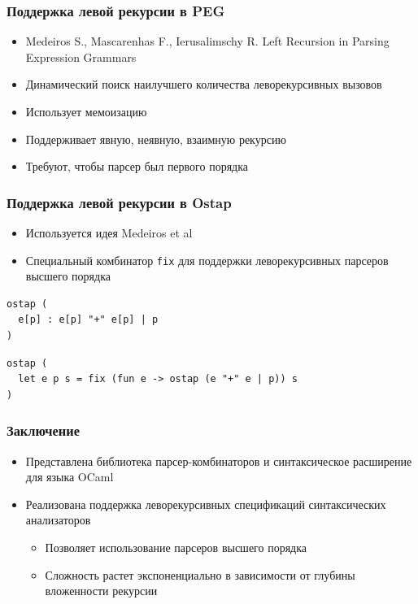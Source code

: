 \documentclass{beamer}
\begin{document}
\begin{frame}
  \transwipe[direction=90]
  \frametitle{Поддержка левой рекурсии в PEG}
  \begin{itemize}
    \item Medeiros S., Mascarenhas F., Ierusalimschy R. Left Recursion in Parsing Expression Grammars 
    \item Динамический поиск наилучшего количества леворекурсивных вызовов
    \item Использует мемоизацию
    \item Поддерживает явную, неявную, взаимную рекурсию
    \item Требуют, чтобы парсер был первого порядка
  \end{itemize}
\end{frame}

\begin{frame}[fragile]
  \transwipe[direction=90]
  \frametitle{Поддержка левой рекурсии в Ostap}
  \begin{itemize} 
    \item Используется идея Medeiros et al
    \item Специальный комбинатор \verb!fix! для поддержки леворекурсивных парсеров высшего порядка
  \end{itemize}
\begin{lstlisting}[frame=single]  
ostap (
  e[p] : e[p] "+" e[p] | p
)
\end{lstlisting}

\begin{lstlisting}[frame=single]  
ostap (
  let e p s = fix (fun e -> ostap (e "+" e | p)) s
)
\end{lstlisting}
\end{frame}


\begin{frame}[fragile]
  \transwipe[direction=90]
  \frametitle{Заключение}
  \begin{itemize} 
    \item Представлена библиотека парсер-комбинаторов и синтаксическое расширение для языка OCaml
    \item Реализована поддержка леворекурсивных спецификаций синтаксических анализаторов
    \begin{itemize}
      \item Позволяет использование парсеров высшего порядка
      \item Сложность растет экспоненциально в зависимости от глубины вложенности рекурсии
    \end{itemize}
  \end{itemize}
\end{frame}
\end{document}
